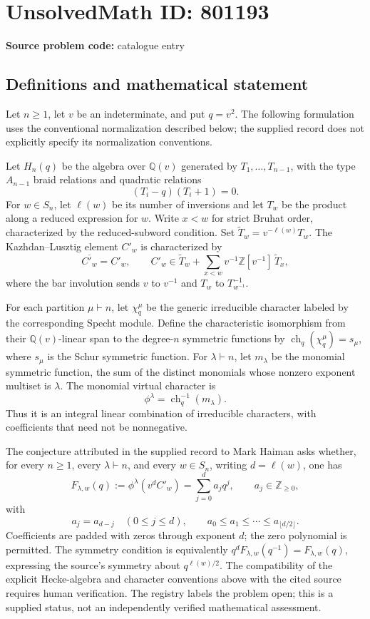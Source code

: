 \documentclass[11pt]{article}
\newcommand{\Z}{\mathbb{Z}}
\newcommand{\Q}{\mathbb{Q}}
\begin{document}
\section*{UnsolvedMath ID: 801193}
\textbf{Source problem code:} catalogue entry
\subsection{Definitions and mathematical statement}
Let \(n\geq 1\), let \(v\) be an indeterminate, and put \(q=v^2\). The following formulation uses the conventional normalization described below; the supplied record does not explicitly specify its normalization conventions.

Let \(H_n(q)\) be the algebra over \(\Q(v)\) generated by \(T_1,\ldots,T_{n-1}\), with the type \(A_{n-1}\) braid relations and quadratic relations
\[
(T_i-q)(T_i+1)=0.
\]
For \(w\in S_n\), let \(\ell(w)\) be its number of inversions and let \(T_w\) be the product along a reduced expression for \(w\). Write \(x<w\) for strict Bruhat order, characterized by the reduced-subword condition. Set \(\widetilde T_w=v^{-\ell(w)}T_w\). The Kazhdan--Lusztig element \(C'_w\) is characterized by
\[
\overline{C'_w}=C'_w,
\qquad
C'_w\in \widetilde T_w+
\sum_{x<w}v^{-1}\Z[v^{-1}]\,\widetilde T_x,
\]
where the bar involution sends \(v\) to \(v^{-1}\) and \(T_w\) to \(T_{w^{-1}}^{-1}\).

For each partition \(\mu\vdash n\), let \(\chi_q^\mu\) be the generic irreducible character labeled by the corresponding Specht module. Define the characteristic isomorphism from their \(\Q(v)\)-linear span to the degree-\(n\) symmetric functions by \(\operatorname{ch}_q(\chi_q^\mu)=s_\mu\), where \(s_\mu\) is the Schur symmetric function. For \(\lambda\vdash n\), let \(m_\lambda\) be the monomial symmetric function, the sum of the distinct monomials whose nonzero exponent multiset is \(\lambda\). The monomial virtual character is
\[
\phi^\lambda=\operatorname{ch}_q^{-1}(m_\lambda).
\]
Thus it is an integral linear combination of irreducible characters, with coefficients that need not be nonnegative.

The conjecture attributed in the supplied record to Mark Haiman asks whether, for every \(n\geq1\), every \(\lambda\vdash n\), and every \(w\in S_n\), writing \(d=\ell(w)\), one has
\[
F_{\lambda,w}(q):=\phi^\lambda\!\left(v^d C'_w\right)
=\sum_{j=0}^{d}a_jq^j,
\qquad a_j\in\Z_{\geq0},
\]
with
\[
a_j=a_{d-j}\quad(0\leq j\leq d),
\qquad
 a_0\leq a_1\leq\cdots\leq a_{\lfloor d/2\rfloor}.
\]
Coefficients are padded with zeros through exponent \(d\); the zero polynomial is permitted. The symmetry condition is equivalently \(q^dF_{\lambda,w}(q^{-1})=F_{\lambda,w}(q)\), expressing the source's symmetry about \(q^{\ell(w)/2}\). The compatibility of the explicit Hecke-algebra and character conventions above with the cited source requires human verification. The registry labels the problem open; this is a supplied status, not an independently verified mathematical assessment.
\end{document}
